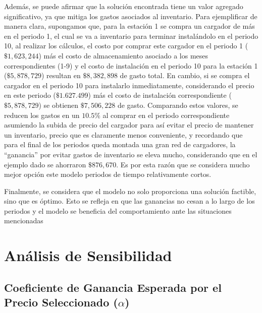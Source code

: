 \documentclass[letterpaper]{article}
\begin{document}
\begin{flushleft}
	Además, se puede afirmar que la solución encontrada tiene un valor agregado significativo, ya
	que mitiga los gastos asociados al inventario. Para ejemplificar de manera clara, supongamos
	que, para la estación 1 se compra un cargador de más en el periodo 1, el cual se va a inventario
	para terminar instalándolo en el periodo 10, al realizar los cálculos, el costo por comprar
	este cargador en el periodo 1 ($\$1,623,244$) más el costo de almacenamiento asociado a los meses
		correspondientes (1-9) y el costo de instalación en el periodo 10 para la estación 1 ($\$5,878,729$)
		resultan en $\$8,382,898$ de gasto total. En cambio, si se compra el cargador en el periodo 10 para
		instalarlo inmediatamente, considerando el precio en este periodo ($\$1.627.499$) más el costo de
		instalación correspondiente ($\$5,878,729$) se obtienen $\$7,506,228$ de gasto. Comparando estos
		valores, se reducen los gastos en un $10.5\%$ al comprar en el periodo correspondiente asumiendo
		la subida de precio del cargador para así evitar el precio de mantener un inventario, precio
		que es claramente menos conveniente, y recordando que para el final de los periodos queda
		montada una gran red de cargadores, la “ganancia” por evitar gastos de inventario se eleva
		mucho, considerando que en el ejemplo dado se ahorraron $\$876,670$. Es por esta razón que se
		considera mucho mejor opción este modelo periodos de tiempo relativamente cortos.

		Finalmente, se considera que el modelo no solo proporciona una solución factible, sino que
		es óptimo. Esto se refleja en que las ganancias no cesan a lo largo de los periodos y el modelo
		se beneficia del comportamiento ante las situaciones mencionadas

		\newpage
		\section{Análisis de Sensibilidad}


		\subsection*{Coeficiente de Ganancia Esperada por el Precio Seleccionado ($\alpha$)}


\end{flushleft}
\end{document}

